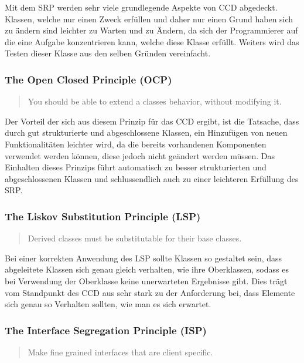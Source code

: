 Mit dem SRP werden sehr viele grundlegende Aspekte von CCD abgedeckt. Klassen, welche nur einen Zweck erfüllen und daher nur einen Grund haben sich zu ändern sind leichter zu Warten und zu Ändern, da sich der Programmierer auf die eine Aufgabe konzentrieren kann, welche diese Klasse erfüllt. Weiters wird das Testen dieser Klasse aus den selben Gründen vereinfacht. 

\subsubsection{The Open Closed Principle (OCP)}
\begin{quotation}
	You should be able to extend a classes behavior, without modifying it.
\end{quotation}

Der Vorteil der sich aus diesem Prinzip für das CCD ergibt, ist die Tatsache, dass durch gut strukturierte und abgeschlossene Klassen, ein Hinzufügen von neuen Funktionalitäten leichter wird, da die bereits vorhandenen Komponenten verwendet werden können, diese jedoch nicht geändert werden müssen. Das Einhalten dieses Prinzips führt automatisch zu besser strukturierten und abgeschlossenen Klassen und schlussendlich auch zu einer leichteren Erfüllung des SRP.

\subsubsection{The Liskov Substitution Principle (LSP)}
\begin{quotation}
	Derived classes must be substitutable for their base classes.
\end{quotation}

Bei einer korrekten Anwendung des LSP sollte Klassen so gestaltet sein, dass abgeleitete Klassen sich genau gleich verhalten, wie ihre Oberklassen, sodass es bei Verwendung der Oberklasse keine unerwarteten Ergebnisse gibt. Dies trägt vom Standpunkt des CCD aus sehr stark zu der Anforderung bei, dass Elemente sich genau so Verhalten sollten, wie man es sich erwartet.

\subsubsection{The Interface Segregation Principle (ISP)}
\begin{quotation}
	Make fine grained interfaces that are client specific.
\end{quotation}

